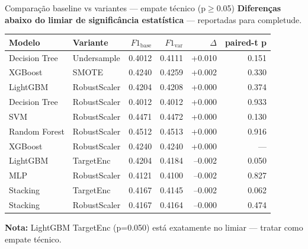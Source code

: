 \documentclass[aspectratio=169]{beamer}
\begin{document}
\begin{frame}{Comparação baseline vs variantes — empate técnico (p$\geq$0.05)}
\textbf{Diferenças abaixo do limiar de significância estatística} — reportadas para completude.

\vspace{0.3em}
\centering
\small
\begin{tabular}{llrrrr}
\toprule
\textbf{Modelo} & \textbf{Variante} & $F1_{\text{base}}$ & $F1_{\text{var}}$ & $\Delta$ & paired-t p \\
\midrule
Decision Tree & Undersample  & 0.4012 & 0.4111 & +0.010 & 0.151 \\
XGBoost       & SMOTE        & 0.4240 & 0.4259 & +0.002 & 0.330 \\
LightGBM      & RobustScaler & 0.4204 & 0.4208 & +0.000 & 0.374 \\
Decision Tree & RobustScaler & 0.4012 & 0.4012 & +0.000 & 0.933 \\
SVM           & RobustScaler & 0.4471 & 0.4472 & +0.000 & 0.130 \\
Random Forest & RobustScaler & 0.4512 & 0.4513 & +0.000 & 0.916 \\
XGBoost       & RobustScaler & 0.4240 & 0.4240 & +0.000 & --- \\
LightGBM      & TargetEnc    & 0.4204 & 0.4184 & --0.002 & 0.050 \\
MLP           & RobustScaler & 0.4121 & 0.4100 & --0.002 & 0.827 \\
Stacking      & TargetEnc    & 0.4167 & 0.4145 & --0.002 & 0.062 \\
Stacking      & RobustScaler & 0.4167 & 0.4164 & --0.000 & 0.474 \\
\bottomrule
\end{tabular}

\vspace{0.4em}
\footnotesize \textbf{Nota:} LightGBM TargetEnc (p=0.050) está exatamente no limiar — tratar como empate técnico.
\end{frame}
\end{document}
